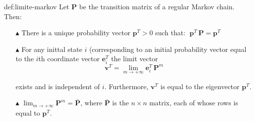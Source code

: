 \begin{theo}{def:limite-markov}
    Let $\pmb{P}$ be the transition matrix of a regular Markov chain. Then:
    \vspace{-0.5em}
    \begin{enumerate}[leftmargin=1.7em]
        \item[$\blacktriangle$] There is a unique probability vector $\pmb{p}^T > 0$ such that: $\; \pmb{p}^T\,\pmb{P} = \pmb{p}^T $
        
        \item[$\blacktriangle$] For any inittal state $i$ (corresponding to an initial probability vector equal to the $i$th coordinate vector $\pmb{e}_i^T$ the limit vector
                        \vspace{-0.75em}$$ \pmb{v}^T = \lim_{m\to+\infty} \pmb{e}_i^T\,\pmb{P}^m $$
        
        \vspace{-1.25em}
        \noindent exists and is independent of $i$. Furthermore, $\pmb{v}^T$ is equal to the eigenvector $\pmb{p}^T$.

        \item[$\blacktriangle$] $\lim_{m\to+\infty} \pmb{P}^m = \pmb{\bar{P}}$, where $\pmb{\bar{P}}$ is the $n \times n$ matrix, each of whose rows is equal to $\pmb{p}^T$.
    \end{enumerate}
\end{theo}

